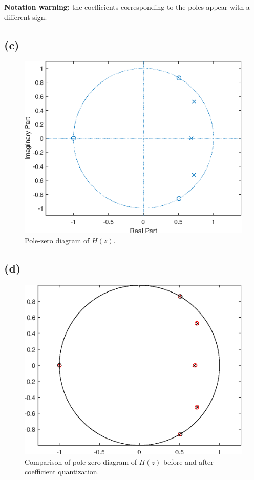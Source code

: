 \documentclass{article}
\begin{document}
\noindent\textbf{Notation warning:} the coefficients corresponding to the poles appear with a different sign.
\subsection{(c)}

\FloatBarrier
\begin{figure}[h!]
	\centering
	\includegraphics[scale=0.7]{figs/hw04q6_zplane.eps}
	\caption{Pole-zero diagram of $H(z)$.}
\end{figure}
\FloatBarrier

\subsection{(d)}

\FloatBarrier
\begin{figure}[h!]
	\centering
	\includegraphics[scale=0.7]{figs/hw04q6_zplane_quant.eps}
	\caption{Comparison of pole-zero diagram of $H(z)$ before and after coefficient quantization.}
\end{figure}
\FloatBarrier
\end{document}
